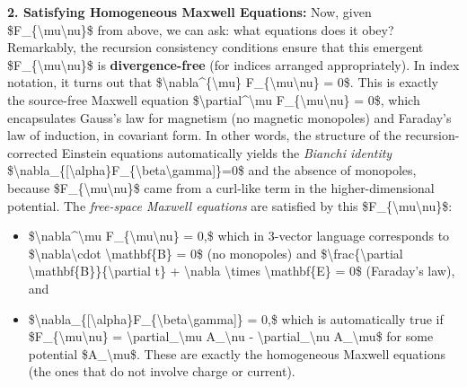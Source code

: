 \documentclass[
]{article}
\begin{document}
\textbf{2. Satisfying Homogeneous Maxwell Equations:} Now, given
\$F\_\{\textbackslash mu\textbackslash nu\}\$ from above, we can ask:
what equations does it obey? Remarkably, the recursion consistency
conditions ensure that this emergent
\$F\_\{\textbackslash mu\textbackslash nu\}\$ is
\textbf{divergence-free} (for indices arranged appropriately). In index
notation, it turns out that
\$\textbackslash nabla\^{}\{\textbackslash mu\}
F\_\{\textbackslash mu\textbackslash nu\} = 0\$\hspace{0pt}. This is
exactly the source-free Maxwell equation
\$\textbackslash partial\^{}\textbackslash mu
F\_\{\textbackslash mu\textbackslash nu\} = 0\$, which encapsulates
Gauss's law for magnetism (no magnetic monopoles) and Faraday's law of
induction, in covariant form. In other words, the structure of the
recursion-corrected Einstein equations automatically yields the
\emph{Bianchi identity}
\$\textbackslash nabla\_\{{[}\textbackslash alpha\}F\_\{\textbackslash beta\textbackslash gamma{]}\}=0\$
and the absence of monopoles, because
\$F\_\{\textbackslash mu\textbackslash nu\}\$ came from a curl-like term
in the higher-dimensional potential\hspace{0pt}. The \emph{free-space
Maxwell equations} are satisfied by this
\$F\_\{\textbackslash mu\textbackslash nu\}\$:

\begin{itemize}
\item
  \$\textbackslash nabla\^{}\textbackslash mu
  F\_\{\textbackslash mu\textbackslash nu\} = 0,\$ which in 3-vector
  language corresponds to \$\textbackslash nabla\textbackslash cdot
  \textbackslash mathbf\{B\} = 0\$ (no monopoles) and
  \$\textbackslash frac\{\textbackslash partial
  \textbackslash mathbf\{B\}\}\{\textbackslash partial t\} +
  \textbackslash nabla \textbackslash times \textbackslash mathbf\{E\} =
  0\$ (Faraday's law), and
\item
  \$\textbackslash nabla\_\{{[}\textbackslash alpha\}F\_\{\textbackslash beta\textbackslash gamma{]}\}
  = 0,\$ which is automatically true if
  \$F\_\{\textbackslash mu\textbackslash nu\} =
  \textbackslash partial\_\textbackslash mu A\_\textbackslash nu -
  \textbackslash partial\_\textbackslash nu A\_\textbackslash mu\$ for
  some potential \$A\_\textbackslash mu\$. These are exactly the
  homogeneous Maxwell equations (the ones that do not involve charge or
  current)\hspace{0pt}.
\end{itemize}
\end{document}
